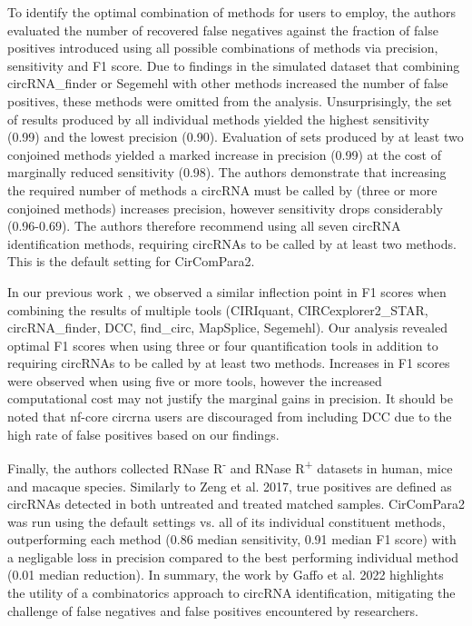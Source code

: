 \documentclass[pdflatex,sn-mathphys-num]{sn-jnl}
\begin{document}
To identify the optimal combination of methods for users to employ, the authors evaluated the number of recovered false negatives against the fraction of false positives introduced using all possible combinations of methods via precision, sensitivity and F1 score. Due to findings in the simulated dataset that combining circRNA\_finder or Segemehl with other methods increased the number of false positives, these methods were omitted from the analysis. Unsurprisingly, the set of results produced by all individual methods yielded the highest sensitivity (0.99) and the lowest precision (0.90). Evaluation of sets produced by at least two conjoined methods yielded a marked increase in precision (0.99) at the cost of marginally reduced sensitivity (0.98). The authors demonstrate that increasing the required number of methods a circRNA must be called by (three or more conjoined methods) increases precision, however sensitivity drops considerably (0.96-0.69). The authors therefore recommend using all seven circRNA identification methods, requiring circRNAs to be called by at least two methods. This is the default setting for CirComPara2. \par

In our previous work \cite{Digby2023Dec}, we observed a similar inflection point in F1 scores when combining the results of multiple tools (CIRIquant, CIRCexplorer2\_STAR, circRNA\_finder, DCC, find\_circ, MapSplice, Segemehl). Our analysis revealed optimal F1 scores when using three or four quantification tools in addition to requiring circRNAs to be called by at least two methods. Increases in F1 scores were observed when using five or more tools, however the increased computational cost may not justify the marginal gains in precision. It should be noted that nf-core circrna users are discouraged from including DCC due to the high rate of false positives based on our findings. \par

Finally, the authors collected RNase R\textsuperscript{-} and RNase R\textsuperscript{+} datasets in human, mice and macaque species. Similarly to Zeng et al. 2017, true positives are defined as circRNAs detected in both untreated and treated matched samples. CirComPara2 was run using the default settings vs. all of its individual constituent methods, outperforming each method (0.86 median sensitivity, 0.91 median F1 score) with a negligable loss in precision compared to the best performing individual method (0.01 median reduction). In summary, the work by Gaffo et al. 2022 highlights the utility of a combinatorics approach to circRNA identification, mitigating the challenge of false negatives and false positives encountered by researchers.
\end{document}
